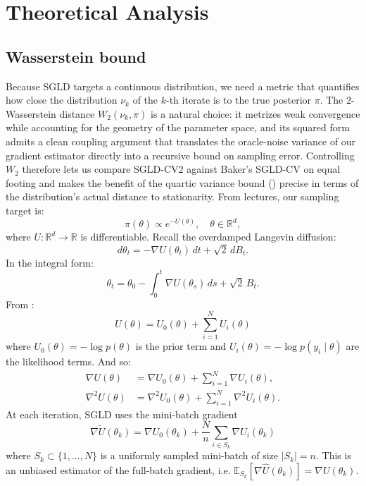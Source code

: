 \section{Theoretical Analysis}
\label{sec:theory}
\subsection{Wasserstein bound}
Because SGLD targets a continuous distribution, we need a metric that quantifies how close the distribution $\nu_k$ of the $k$-th iterate is to the true posterior $\pi$. The 2-Wasserstein distance $W_2(\nu_k,\pi)$ is a natural choice: it metrizes weak convergence while accounting for the geometry of the parameter space, and its squared form admits a clean coupling argument that translates the oracle-noise variance of our gradient estimator directly into a recursive bound on sampling error. Controlling $W_2$ therefore lets us compare SGLD-CV2 against Baker's SGLD-CV on equal footing and makes the benefit of the quartic variance bound () precise in terms of the distribution's actual distance to stationarity.
From lectures, our sampling target is:
$$
    \pi(\theta) \propto e^{-U(\theta)}, \quad \theta \in \mathbb{R}^d,
$$
where $U : \mathbb{R}^d \to \mathbb{R}$ is differentiable.
Recall the overdamped Langevin diffusion:
$$
    d\theta_t = -\nabla U(\theta_t)\,dt + \sqrt{2}\,dB_t.
$$
In the integral form:
$$
    \theta_t = \theta_0 - \int_0^t \nabla U(\theta_s)\,ds + \sqrt{2}\,B_t.
$$
From \citet{welling2011}:
$$U(\theta) = U_0(\theta) + \sum_{i=1}^N U_i(\theta)$$
where $U_0(\theta) = -\log p(\theta)$ is the prior term and $U_i(\theta) = -\log p(y_i \mid \theta)$ are the likelihood terms. And so:
\begin{align}
    \nabla U(\theta) &= \nabla U_0(\theta) + \sum_{i=1}^N \nabla U_i(\theta), \\
    \nabla^2 U(\theta) &= \nabla^2 U_0(\theta) + \sum_{i=1}^N \nabla^2 U_i(\theta).
\end{align}
At each iteration, SGLD uses the mini-batch gradient
\begin{equation}
    \nabla \tilde{U}(\theta_k) = \nabla U_0(\theta_k) 
    + \frac{N}{n}\sum_{i \in S_k} \nabla U_i(\theta_k)
\end{equation}
where $S_k \subset \{1,\ldots,N\}$ is a uniformly sampled mini-batch of size 
$|S_k| = n$. This is an unbiased estimator of the full-batch gradient, i.e. $\mathbb{E}_{S_k}\!\left[\nabla \hat{U}(\theta_k)\right] = \nabla U(\theta_k)$.

